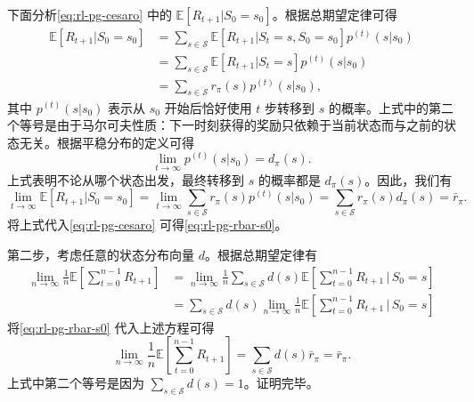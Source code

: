 \begin{note}
下面分析\cref{eq:rl-pg-cesaro} 中的 $\mathbb{E}[R_{t+1}|S_0 = s_0]$。根据总期望定律可得
\begin{equation}
\begin{aligned}
\mathbb{E}\left[ R_{t+1} | S_0 = s_0 \right]
&= \sum_{s \in \mathcal{S}} \mathbb{E}\left[ R_{t+1} | S_t = s, S_0 = s_0 \right] p^{(t)}(s|s_0) \\
&= \sum_{s \in \mathcal{S}} \mathbb{E}\left[ R_{t+1} | S_t = s \right] p^{(t)}(s|s_0) \\
&= \sum_{s \in \mathcal{S}} r_{\pi}(s) p^{(t)}(s|s_0),
\end{aligned}
\end{equation}
其中 $p^{(t)}(s|s_0)$ 表示从 $s_0$ 开始后恰好使用 $t$ 步转移到 $s$ 的概率。上式中的第二个等号是由于马尔可夫性质：下一时刻获得的奖励只依赖于当前状态而与之前的状态无关。根据平稳分布的定义可得
\begin{equation}
\lim_{t \to \infty} p^{(t)}(s|s_0) = d_{\pi}(s).
\end{equation}
上式表明不论从哪个状态出发，最终转移到 $s$ 的概率都是 $d_{\pi}(s)$。因此，我们有
\begin{equation}
\lim_{t \to \infty} \mathbb{E}\left[ R_{t+1} | S_0 = s_0 \right] = \lim_{t \to \infty} \sum_{s \in \mathcal{S}} r_{\pi}(s) p^{(t)}(s|s_0) = \sum_{s \in \mathcal{S}} r_{\pi}(s) d_{\pi}(s) = \bar{r}_{\pi}.
\end{equation}
将上式代入\cref{eq:rl-pg-cesaro} 可得\cref{eq:rl-pg-rbar-s0}。

第二步，考虑任意的状态分布向量 $d$。根据总期望定律有
\begin{equation}
\begin{aligned}
\lim_{n \to \infty} \frac{1}{n} \mathbb{E}\left[ \sum_{t=0}^{n-1} R_{t+1} \right]
&= \lim_{n \to \infty} \frac{1}{n} \sum_{s \in \mathcal{S}} d(s) \mathbb{E}\left[ \sum_{t=0}^{n-1} R_{t+1} \,\Big|\, S_0 = s \right] \\
&= \sum_{s \in \mathcal{S}} d(s) \lim_{n \to \infty} \frac{1}{n} \mathbb{E}\left[ \sum_{t=0}^{n-1} R_{t+1} \,\Big|\, S_0 = s \right]
\end{aligned}
\end{equation}
将\cref{eq:rl-pg-rbar-s0} 代入上述方程可得
\begin{equation}
\lim_{n \to \infty} \frac{1}{n} \mathbb{E}\left[ \sum_{t=0}^{n-1} R_{t+1} \right] = \sum_{s \in \mathcal{S}} d(s) \bar{r}_{\pi} = \bar{r}_{\pi}.
\end{equation}
上式中第二个等号是因为 $\sum_{s\in \mathcal{S}}d(s) = 1$。证明完毕。
\end{note}

